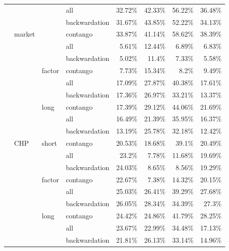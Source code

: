 \documentclass[]{elsarticle} %
\begin{document}
\begin{longtable}[t]{>{}llllrrrr}
\endfoot
\bottomrule
\endlastfoot
 &  &  & all & 32.72\% & 42.33\% & 56.22\% & 36.48\%\\
\nopagebreak
 &  &  & backwardation & 31.67\% & 43.85\% & 52.22\% & 34.13\%\\
\nopagebreak
 & \multirow[t]{-3}{*}{\raggedright\arraybackslash market} &  & contango & 33.87\% & 41.14\% & 58.62\% & 38.39\%\\
\nopagebreak
 &  &  & all & 5.61\% & 12.44\% & 6.89\% & 6.83\%\\
\nopagebreak
 &  &  & backwardation & 5.02\% & 11.4\% & 7.33\% & 5.58\%\\
\nopagebreak
 &  & \multirow[t]{-6}{*}{\raggedright\arraybackslash factor} & contango & 7.73\% & 15.34\% & 8.2\% & 9.49\%\\
\nopagebreak
 &  &  & all & 17.09\% & 27.87\% & 40.38\% & 17.61\%\\
\nopagebreak
 &  &  & backwardation & 17.36\% & 26.97\% & 33.21\% & 13.37\%\\
\nopagebreak
 &  & \multirow[t]{-3}{*}{\raggedright\arraybackslash long} & contango & 17.39\% & 29.12\% & 44.06\% & 21.69\%\\
\nopagebreak
 &  &  & all & 16.49\% & 21.39\% & 35.95\% & 16.37\%\\
\nopagebreak
 &  &  & backwardation & 13.19\% & 25.78\% & 32.18\% & 12.42\%\\
\nopagebreak
 & \multirow[t]{-9}{*}{\raggedright\arraybackslash CHP} & \multirow[t]{-3}{*}{\raggedright\arraybackslash short} & contango & 20.53\% & 18.68\% & 39.1\% & 20.49\%\\
\nopagebreak
 &  &  & all & 23.2\% & 7.78\% & 11.68\% & 19.69\%\\
\nopagebreak
 &  &  & backwardation & 24.03\% & 8.65\% & 8.56\% & 19.29\%\\
\nopagebreak
 &  & \multirow[t]{-3}{*}{\raggedright\arraybackslash factor} & contango & 22.67\% & 7.38\% & 14.32\% & 20.15\%\\
\nopagebreak
 &  &  & all & 25.03\% & 26.41\% & 39.29\% & 27.68\%\\
\nopagebreak
 &  &  & backwardation & 26.05\% & 28.34\% & 34.39\% & 27.3\%\\
\nopagebreak
 &  & \multirow[t]{-3}{*}{\raggedright\arraybackslash long} & contango & 24.42\% & 24.86\% & 41.79\% & 28.25\%\\
\nopagebreak
 &  &  & all & 23.67\% & 22.99\% & 34.48\% & 17.13\%\\
\nopagebreak
 &  &  & backwardation & 21.81\% & 26.13\% & 33.14\% & 14.96\%\\

\end{longtable}
\end{document}
